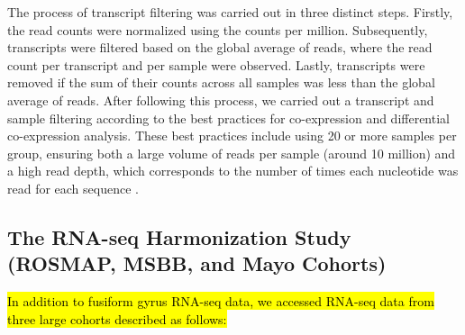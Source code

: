 \documentclass[utf8]{FrontiersinHarvard} %
\begin{document}
The process of transcript filtering was carried out in three distinct steps. Firstly, the read counts were normalized using the counts per million. Subsequently, transcripts were filtered based on the global average of reads, where the read count per transcript and per sample were observed. Lastly, transcripts were removed if the sum of their counts across all samples was less than the global average of reads. After following this process, we carried out a transcript and sample filtering according to the best practices for co-expression and differential co-expression analysis. These best practices include using 20 or more samples per group, ensuring both a large volume of reads per sample (around 10 million) and a high read depth, which corresponds to the number of times each nucleotide was read for each sequence \citep{ballouz2015guidance}.

\subsection{The RNA-seq Harmonization Study (ROSMAP, MSBB, and Mayo Cohorts)}

\hl{In addition to fusiform gyrus RNA-seq data, we accessed RNA-seq data from three large cohorts described as follows:}
\end{document}
